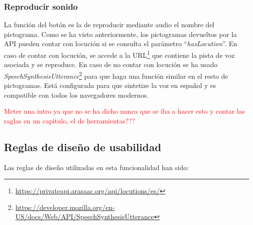 \subsubsection{Reproducir sonido}


La función del botón es la de reproducir mediante audio el nombre del pictograma. Como se ha visto anteriormente, los pictogramas devueltos por la API pueden contar con locución si se consulta el parámetro “\textit{hasLocution}”. En caso de contar con locución, se accede a la URL\footnote{\url{https://privateapi.arasaac.org/api/locutions/es/}} que contiene la pista de voz asociada y se reproduce. 
En caso de no contar con locución se ha usado \textit{SpeechSynthesisUtterance}\footnote{\url{https://developer.mozilla.org/en-US/docs/Web/API/SpeechSynthesisUtterance}} para que haga una función similar en el resto de pictogramas. Está configurada para que sintetize la voz en español y es compatible con todos los navegadores modernos.

 \textcolor{red}{Meter una intro ya que no se ha dicho nunca que se iba a hacer esto y contar las raglas en un capitulo, el de herramientas???}
\subsection{Reglas de diseño de usabilidad}
 Las reglas de diseño utilizadas en esta funcionalidad han sido:

